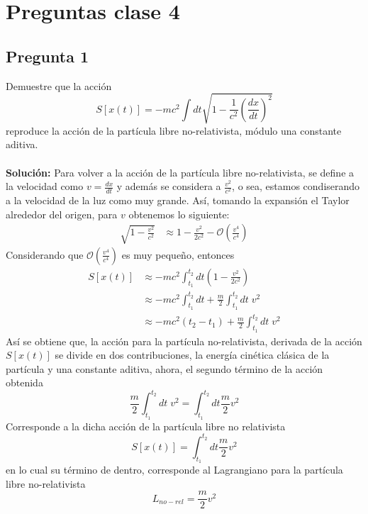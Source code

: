 \documentclass[../main.tex]{subfiles}
\begin{document}
\section{Preguntas clase 4}

\subsection*{Pregunta 1}
Demuestre que la acción 
\begin{equation}
  S[x(t)]=-mc^2\int dt \sqrt{1-\frac{1}{c^2}\left( \frac{dx}{dt}\right)^2}
\end{equation}
reproduce la acción de la partícula libre no-relativista, módulo una constante aditiva. \\
\\

\textbf{Solución:}
Para volver a la acción de la partícula libre no-relativista, se define a la velocidad como $v=\frac{dx}{dt}$ y además se considera a $\frac{v^2}{c^2}$, o sea, estamos condiserando a la velocidad de la luz como muy grande. Así, tomando la expansión el Taylor alrededor del origen, para $v$ obtenemos lo siguiente:
\begin{align*} 
  \sqrt{1-\frac{v^2}{c^2}} & \approx 1 - \frac{v^2}{2c^2} - \mathcal{O}\left( \frac{v^4}{c^4}
  \right)
\end{align*}
Considerando que $\mathcal{O}\left( \frac{v^4}{c^4}\right)$ es muy pequeño, entonces 
\begin{align*}
  S[x(t)] & \approx -mc^2\int_{t_1}^{t_2} dt\left(1-\frac{v^2}{2c^2}  \right) \\
  & \approx -mc^2\int_{t_1}^{t_2} dt + \frac{m}{2}\int_{t_1}^{t_2}dt\; v^2 \\
  & \approx -mc^2(t_2-t_1) + \frac{m}{2}\int_{t_1}^{t_2}dt \; v^2
\end{align*}
Así se obtiene que, la acción para la partícula no-relativista, derivada de la acción $S[x(t)]$ se divide en dos contribuciones, la energía cinética clásica de la partícula y una constante aditiva, ahora, el segundo término de la acción obtenida
\begin{equation}
  \frac{m}{2}\int_{t_1}^{t_2}dt \; v^2 = \int_{t_1}^{t_2}dt\frac{m}{2}v^2
\end{equation}
Corresponde a la dicha acción de la partícula libre no relativista
\begin{equation}
  S[x(t)]=\int_{t_1}^{t_2}dt\frac{m}{2}v^2
\end{equation}
en lo cual su término de dentro, corresponde al Lagrangiano para la partícula libre no-relativista
\begin{equation}
  L_{no-rel} = \frac{m}{2}v^2
\end{equation}
\\
\end{document}
